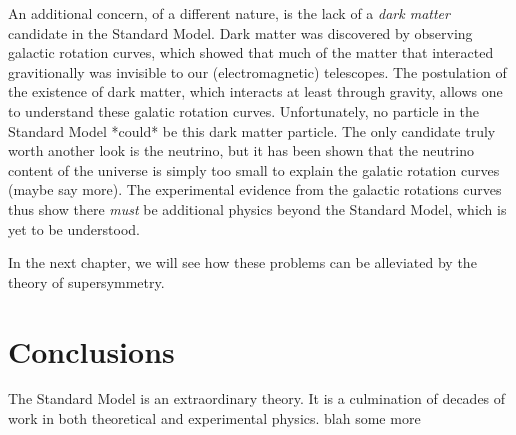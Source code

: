 An additional concern, of a different nature, is the lack of a \textit{dark matter} candidate in the Standard Model.
Dark matter was discovered by observing galactic rotation curves, which showed that much of the matter that interacted gravitionally was invisible to our (electromagnetic) telescopes. 
The postulation of the existence of dark matter, which interacts at least through gravity, allows one to understand these galatic rotation curves. 
Unfortunately, no particle in the Standard Model *could* be this dark matter particle.
The only candidate truly worth another look is the neutrino, but it has been shown that the neutrino content of the universe is simply too small to explain the galatic rotation curves (maybe say more).
The experimental evidence from the galactic rotations curves thus show there \textit{must} be additional physics beyond the Standard Model, which is yet to be understood.

In the next chapter, we will see how these problems can be alleviated by the theory of supersymmetry.

\section{Conclusions}

The Standard Model is an extraordinary theory.
It is a culmination of decades of work in both theoretical and experimental physics.
blah some more






